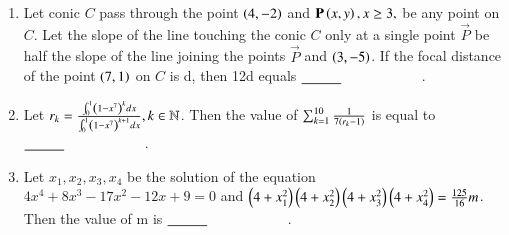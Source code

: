 \documentclass[journal,12pt,onecolumn]{IEEEtran}
\theoremstyle{remark}
\begin{document}
\begin{enumerate}
        \item Let  conic $C$ pass through the point $\left(4,-2\right)$ and $\mathbf{P}\left(x,y\right),x \geq 3,$ be any point on $C$. Let the slope of the line touching the conic $C$ only at a single point $\vec{P}$ be half the slope of the line joining the points $\vec{P}$ and $\left(3,-5\right)$. If the focal distance of the point $\left(7,1\right)$ on $C$ is d, then 12d equals  $\makebox[3cm][l]{\underline{\hspace{1cm}}}$.
        \item Let $r_k=\frac{\int_0^1\left(1-x^7\right)^kdx}{\int_0^1\left(1-x^7\right)^{k+1}dx},k \in \mathbb{N}$. Then the value of $\sum_{k=1}^{10}\frac{1}{7\left(r_k-1\right)}$ is equal to $\makebox[3cm][l]{\underline{\hspace{1cm}}}$.
        \item Let $x_1,x_2,x_3,x_4$ be the solution of the equation $4x^4+8x^3-17x^2-12x+9=0$ and $\left(4+x_1^2\right)\left(4+x_2^2\right)\left(4+x_3^2\right)\left(4+x_4^2\right)=\frac{125}{16}m$. Then the value of m is $\makebox[3cm][l]{\underline{\hspace{1cm}}}$.


    \end{enumerate}
\end{document}
